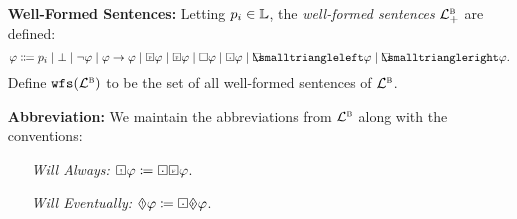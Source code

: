 \documentclass[a4paper, 11pt]{article} %
\begin{document}
\begin{enumerate}[leftmargin=1.2in]
	\item[\bf Well-Formed Sentences:] Letting $p_i \in \mathbb{L}$, the \textit{well-formed sentences} $\mathcal{L}^{\textsc{b}}_+$ are defined:
    \[ \metaA \Coloneq p_i \mid 
      \bot \mid 
      \neg\metaA \mid 
      \metaA \rightarrow \metaA \mid 
      \Past\metaA \mid 
      \Future\metaA \mid
      \Box\metaA \mid
      \Inevitably\metaA \mid
      \Openpast\metaA \mid
      \Openfuture\metaA.
    \]
    Define $\texttt{wfs}(\mathcal{L}^{\textsc{b}})$ to be the set of all well-formed sentences of $\mathcal{L}^{\textsc{b}}$.
  \item[\bf Abbreviation:] We maintain the abbreviations from $\mathcal{L}^{\textsc{b}}$ along with the conventions:
    \begin{multicols}{2}
      \begin{enumerate}
        \item[\it Will Always:] $\Will\varphi \coloneq \Inevitably\Future\varphi$.
        \item[\it Will Eventually:] $\will\varphi \coloneq \Inevitably\future\varphi$.


\end{enumerate}
\end{multicols}
\end{enumerate}
\end{document}
